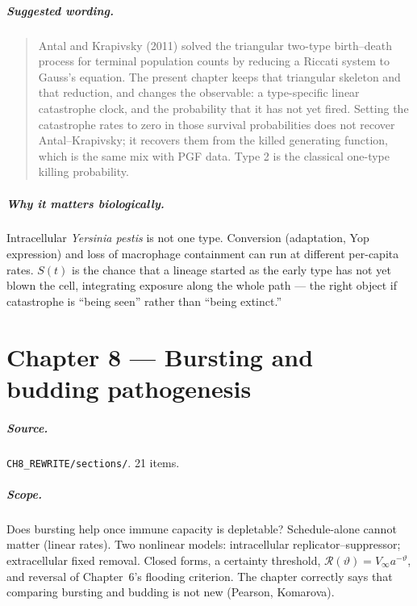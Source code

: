 \documentclass[11pt,a4paper]{report}
\newcommand{\yp}{\textit{Yersinia pestis}}
\begin{document}
\paragraph{Suggested wording.}
\begin{quote}
Antal and Krapivsky (2011) solved the triangular two-type birth--death
process for terminal population counts by reducing a Riccati system to
Gauss's equation. The present chapter keeps that triangular skeleton and
that reduction, and changes the observable: a type-specific linear
catastrophe clock, and the probability that it has not yet fired. Setting
the catastrophe rates to zero in those survival probabilities does not
recover Antal--Krapivsky; it recovers them from the killed generating
function, which is the same mix with PGF data. Type 2 is the classical
one-type killing probability.
\end{quote}

\paragraph{Why it matters biologically.}
Intracellular \yp{} is not one type. Conversion (adaptation, Yop
expression) and loss of macrophage containment can run at different
per-capita rates. \(S(t)\) is the chance that a lineage started as the
early type has not yet blown the cell, integrating exposure along the
whole path --- the right object if catastrophe is ``being seen'' rather
than ``being extinct.''

\chapter{Chapter 8 --- Bursting and budding pathogenesis}
\label{ch:8}

\paragraph{Source.} \texttt{CH8\_REWRITE/sections/}. 21 items.

\paragraph{Scope.}
Does bursting help once immune capacity is depletable? Schedule-alone
cannot matter (linear rates). Two nonlinear models: intracellular
replicator--suppressor; extracellular fixed removal. Closed forms, a
certainty threshold, \(\mathcal{R}(\vartheta)=V_\infty a^{-\vartheta}\),
and reversal of Chapter~6's flooding criterion. The chapter correctly
says that comparing bursting and budding is not new (Pearson, Komarova).
\end{document}
